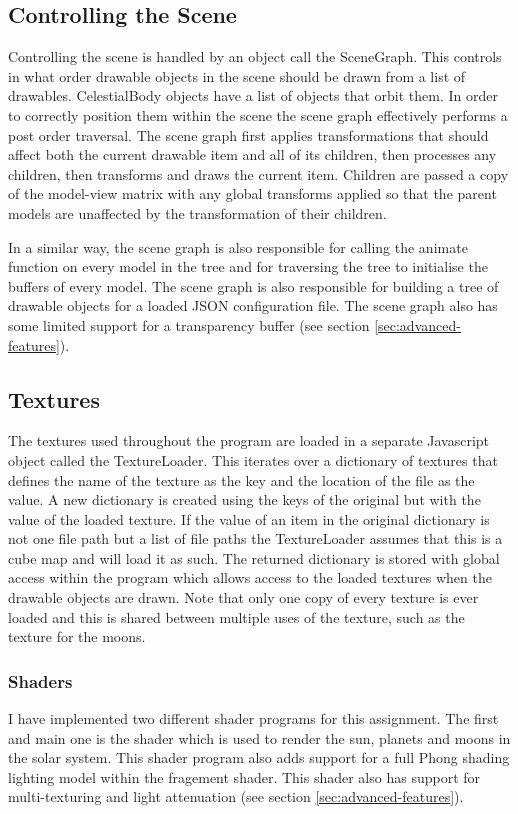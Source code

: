 \documentclass[paper=a4, fontsize=11pt]{scrartcl}	%
\numberwithin{equation}{section}															%
\numberwithin{figure}{section}																%
\numberwithin{table}{section}																%
\begin{document}
\subsection{Controlling the Scene}
Controlling the scene is handled by an object call the SceneGraph. This controls in what order drawable objects in the scene should be drawn from a list of drawables. CelestialBody objects have a list of objects that orbit them. In order to correctly position them within the scene the scene graph effectively performs a post order traversal. The scene graph first applies transformations that should affect both the current drawable item and all of its children, then processes any children, then transforms and draws the current item. Children are passed a copy of the model-view matrix with any global transforms applied so that the parent models are unaffected by the transformation of their children.

In a similar way, the scene graph is also responsible for calling the animate function on every model in the tree and for traversing the tree to initialise the buffers of every model. The scene graph is also responsible for building a tree of drawable objects for a loaded JSON configuration file. The scene graph also has some limited support for a transparency buffer (see section \ref{sec:advanced-features}).

\subsection{Textures}
The textures used throughout the program are loaded in a separate Javascript object called the TextureLoader. This iterates over a dictionary of textures that defines the name of the texture as the key and the location of the file as the value. A new dictionary is created using the keys of the original but with the value of the loaded texture. If the value of an item in the original dictionary is not one file path but a list of file paths the TextureLoader assumes that this is a cube map and will load it as such. The returned dictionary is stored with global access within the program which allows access to the loaded textures when the drawable objects are drawn. Note that only one copy of every texture is ever loaded and this is shared between multiple uses of the texture, such as the texture for the moons.

\subsubsection{Shaders}
I have implemented two different shader programs for this assignment. The first and main one is the shader which is used to render the sun, planets and moons in the solar system. This shader program also adds support for a full Phong shading lighting model within the fragement shader. This shader also has support for multi-texturing and light attenuation (see section \ref{sec:advanced-features}).
\end{document}
